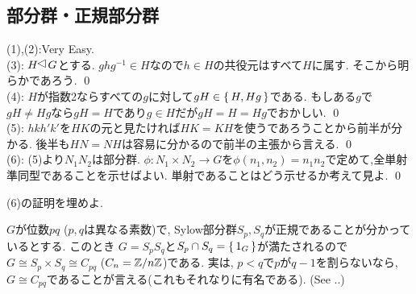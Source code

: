 \subsection{部分群・正規部分群}
\prf (1),(2):Very Easy. \\
(3): $H\norgr G$とする. $ghg^{-1}\in H$なので$h\in H$の共役元はすべて$H$に属す. そこから明らかであろう. \qed \\
(4): $H$が指数2ならすべての$g$に対して$gH\in \set{H,Hg} $である. もしある$g$で$gH \neq Hg$なら$gH = H$であり$g\in H$だが$gH = H = Hg$でおかしい. \qed \\
(5): $hkh'k'$を$HK$の元と見たければ$HK=KH$を使うであろうことから前半が分かる. 後半も$HN=NH$は容易に分かるので前半の主張から言える. \qed \\
(6): (5)より$N_1N_2$は部分群. $\phi:N_1\times N_2 \to G$を$\phi(n_1,n_2) = n_1n_2$で定めて,全単射準同型であることを示せばよい. 単射であることはどう示せるか考えて見よ. \qed
\begin{prac}
(6)の証明を埋めよ.
\end{prac}








\begin{eg}
$G$が位数$pq$ ($p,q$は異なる素数)で, Sylow部分群$S_p,S_q$が正規であることが分かっているとする. このとき
$G = S_pS_q$と$S_p\cap S_q=\set{1_G}$が満たされるので$G\cong S_p\times S_q \cong C_{pq}$ ($C_n = \mathbb{Z}/n\mathbb{Z}$)である. 実は, $p<q$で$p$が$q-1$を割らないなら, $G\cong C_{pq}$であることが言える(これもそれなりに有名である). (See ..)
\end{eg}

